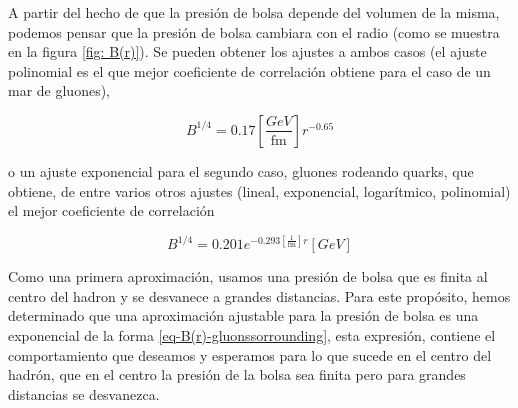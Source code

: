 A partir del hecho de que la presión de bolsa depende del volumen de la misma, podemos pensar que la presión de bolsa cambiara con el radio (como se muestra en la figura \eqref{fig: B(r)}). Se pueden obtener los ajustes a ambos casos (el ajuste polinomial es el que mejor coeficiente de correlación obtiene para el caso de un mar de gluones), 

\begin{equation}\label{eq-B(r)-seagluons}
{B}^{1/4} = 0.17 \left[\frac{\unit{GeV}}{\unit{\femto\meter}}\right] {r}^{-0.65}
\end{equation}

o un ajuste exponencial para el \allowbreak segundo caso, gluones rodeando quarks, que obtiene, de entre \allowbreak varios otros ajustes (lineal, exponencial, \allowbreak logarítmico, polinomial) el mejor \allowbreak coeficiente de correlación

\begin{equation}\label{eq-B(r)-gluonssorrounding}
{B}^{1/4} = 0.201  {e}^{-0.293\left[\frac{1}{\unit{\femto\meter}}\right]r} \left[{\unit{GeV}}\right]
\end{equation}

Como una primera aproximación, usamos una presión de bolsa que es finita al centro del hadron y se desvanece a grandes distancias. Para este propósito, hemos determinado que una aproximación ajustable para la presión de bolsa es una exponencial de la forma \eqref{eq-B(r)-gluonssorrounding}, esta expresión, contiene el comportamiento que deseamos y esperamos para lo que sucede en el centro del hadrón, que en el centro la presión de la bolsa sea finita pero para grandes distancias se desvanezca.
